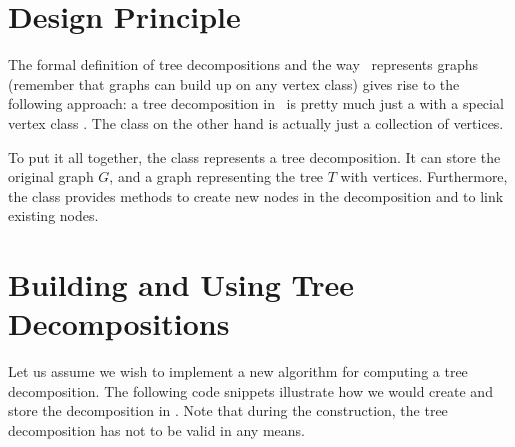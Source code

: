 \documentclass[a4paper, ukenglish, twoside, openright]{jdrasilmanual}
\begin{document}
\section{Design Principle}
The formal definition of tree decompositions and the way \Jdrasil\
represents graphs (remember that graphs can build up on any vertex
class) gives rise to the following approach: a tree decomposition in
\Jdrasil\ is pretty much just a \JClass{Graph} with a special vertex
class . The \JClass{Bag} class on the other hand is actually just a
collection of vertices.

To put it all together, the class 
represents a tree decomposition. It can store the original graph $G$,
and a graph representing the tree $T$ with \JClass{Bag}
vertices. Furthermore, the class  provides
methods to create new nodes in the decomposition and to link existing nodes.

\section{Building and Using Tree Decompositions}
Let us assume we wish to implement a new algorithm for computing a
tree decomposition. The following code snippets illustrate how we would
create and store the decomposition in \Jdrasil. Note that during the
construction, the tree decomposition has not to be valid in any means.
\end{document}
